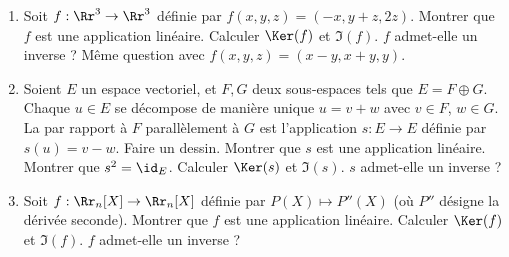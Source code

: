 \documentclass[class=report,crop=false]{standalone}
\begin{document}

\begin{miniexercices}
\sauteligne
\begin{enumerate}
  \item Soit $f : \Rr^3 \to \Rr^3$ définie par $f(x,y,z)=(-x,y+z,2z)$.
  Montrer que $f$ est une application linéaire. Calculer $\Ker(f)$ et $\Im(f)$.
  $f$ admet-elle un inverse ? Même question avec $f(x,y,z) = (x-y,x+y,y)$.

  \item Soient $E$ un espace vectoriel, et $F,G$ deux sous-espaces tels que $E= F \oplus G$.
  Chaque $u\in E$ se décompose de manière unique $u=v+w$ avec $v \in F$, $w\in G$.
  La  par rapport à $F$ parallèlement à $G$ est l'application $s : E \to E$
  définie par $s(u)=v-w$. Faire un dessin. Montrer que $s$ est une application linéaire.
  Montrer que $s^2 = \id_E$. Calculer $\Ker(s)$ et $\Im(s)$. $s$ admet-elle un inverse ?

  \item Soit $f : \Rr_n[X] \to \Rr_n[X]$ définie par $P(X) \mapsto P''(X)$ (où $P''$ désigne la dérivée seconde).
  Montrer que $f$ est une application linéaire. Calculer $\Ker(f)$ et $\Im(f)$. $f$ admet-elle un inverse ?
\end{enumerate}
\end{miniexercices}


\bigskip
\bigskip


\finchapitre
\end{document}
